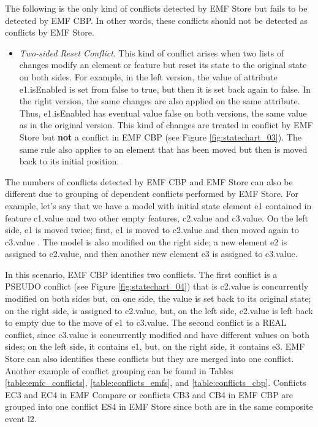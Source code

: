 The following is the only kind of conflicts detected by EMF Store but fails to be detected by EMF CBP. In other words, these conflicts should not be detected as conflicts by EMF Store.
\begin{itemize}
\item \emph{Two-sided Reset Conflict}. This kind of conflict arises when two lists of changes modify an element or feature but reset its state to the original state on both sides. For example, in the left version, the value of attribute \textsf{e1}.\textsf{isEnabled} is set from \textsf{false} to \textsf{true}, but then it is set back again to \textsf{false}. In the right version, the same changes are also applied on the same attribute. Thus, \textsf{e1}.\textsf{isEnabled} has eventual value \textsf{false} on both versions, the same value as in the original version. This kind of changes are treated in conflict by EMF Store but \textbf{not} a conflict in EMF CBP (see Figure \ref{fig:statechart_03}). The same rule also applies to an element that has been moved but then is moved back to its initial position.
\end{itemize}

The numbers of conflicts detected by EMF CBP and EMF Store can also be different due to grouping of dependent conflicts performed by EMF Store. For example, let's say that we have a model with initial state element \textsf{e1} contained in feature \textsf{c1}.\textsf{value} and two other empty features, \textsf{c2}.\textsf{value} and \textsf{c3}.\textsf{value}. On the left side, \textsf{e1} is moved twice; first, \textsf{e1} is moved to \textsf{c2}.\textsf{value} and then moved again to \textsf{c3}.\textsf{value} . The model is also modified on the right side; a new element \textsf{e2} is assigned to \textsf{c2}.\textsf{value}, and then another new element \textsf{e3} is assigned to \textsf{c3}.\textsf{value}. 

In this scenario, EMF CBP identifies two conflicts. The first conflict is a \textsf{PSEUDO} conflict (see Figure \ref{fig:statechart_04}) that is \textsf{c2}.\textsf{value} is concurrently modified on both sides but, on one side, the value is set back to its original state; on the right side,  is assigned to \textsf{c2}.\textsf{value}, but, on the left side, \textsf{c2}.\textsf{value} is left back to empty due to the move of \textsf{e1} to \textsf{c3}.\textsf{value}. The second conflict is a \textsf{REAL} conflict, since \textsf{c3}.\textsf{value} is concurrently modified and have different values on both sides; on the left side, it contains \textsf{e1}, but, on the right side, it contains \textsf{e3}. EMF Store can also identifies these conflicts but they are merged into one conflict. Another example of conflict grouping can be found in Tables \ref{table:emfc_conflicts}, \ref{table:conflicts_emfs}, and \ref{table:conflicts_cbp}. Conflicts \textsf{EC3} and \textsf{EC4} in EMF Compare or conflicts \textsf{CB3} and \textsf{CB4} in EMF CBP are grouped into one conflict \textsf{ES4} in EMF Store since both are in the same composite event \textsf{l2}.


